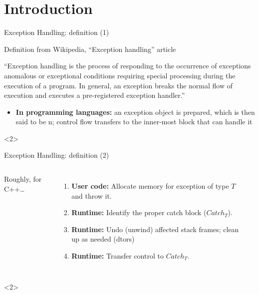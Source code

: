 \section{Introduction}
\begin{frame}{Exception Handling: definition (1)}
  \begin{block}{Definition from Wikipedia, ``Exception handling'' article}
    \begin{center}
      ``{\ttfamily\small Exception handling is the process of responding to the occurrence of exceptions \textemdash{}anomalous or exceptional conditions requiring special processing\textemdash{} during the execution of a program.  In general, an exception breaks the normal flow of execution and executes a pre-registered exception handler.}''
    \end{center}
  \end{block}
  \vfill

  \begin{itemize}
    \item \textbf{In programming languages:} an exception object is prepared, which is then said to be n; control flow transfers to the inner-most  block that can handle it
  \end{itemize}

  \begin{onlyenv}<2>
    \TZoverlayLayer{}{\fontsize{32}{32}\selectfont\smile}
  \end{onlyenv}
\end{frame}

\begin{frame}{Exception Handling: definition (2)}
  \begin{columns}
    Roughly, for C++\ldots{}
    \begin{enumerate}
    \item \textbf{User code:} Allocate memory for exception of type $T$ and throw it.
    \item \textbf{Runtime:} Identify the proper catch block ($Catch_T$).
    \item \textbf{Runtime:} Undo (unwind) affected stack frames; clean up as needed (dtors)
    \item \textbf{Runtime:} Transfer control to $Catch_T$.
    \end{enumerate}

    \begin{center}
      \resizebox{0.9\columnwidth}{!}{}
    \end{center}
  \end{columns}

  \begin{onlyenv}<2>
  \end{onlyenv}
\end{frame}

